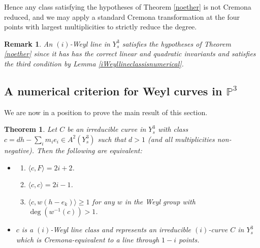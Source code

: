 \documentclass[12pt]{article}
\numberwithin{equation}{section}
\newtheorem{theorem}[equation]{Theorem}
\newtheorem{remark}[equation]{Remark}
\numberwithin{equation}{section}
\numberwithin{subeq}{equation}
\begin{document}
Hence any class satisfying the hypotheses of Theorem \ref{noether}
is not Cremona reduced, and we may apply a standard Cremona transformation
at the four points with largest multiplicities to strictly reduce the degree.

\begin{remark}
An $(i)$-Weyl line in $Y^3_s$ satisfies the hypotheses of Theorem \ref{noether}
since it has has the correct linear and quadratic invariants
and satisfies the third condition by Lemma \ref{iWeyllineclassisnumerical}.
\end{remark}

\subsection{A numerical criterion for Weyl curves in $\mathbb{P}^3$}
We are now in a position to prove the main result of this section.


\begin{theorem}\label{equivalence2}
Let $C$ be an irreducible curve in $Y^3_s$ with class $c = dh-\sum_i m_i e_i \in A^2(Y^3_s)$ 
such that $d>1$ (and all multiplicities non-negative).
Then the following are equivalent:
\begin{itemize}	
\item[(a)] 
	\begin{enumerate}
		\item 	$\langle c, F \rangle=2i+2$. 
		\item	$\langle c, c \rangle= 2i-1$.
		\item	$\langle c, w(h-e_k)\rangle\geq 1$
			for any $w$ in the Weyl group with $\deg(w^{-1}(c))>1$.
	\end{enumerate}
\item[(b)] $c$ is a $(i)$-Weyl line class 
and represents an irreducible $(i)$-curve $C$ in $Y^3_s$ 
which is Cremona-equivalent to a line through $1-i$ points.
\end{itemize}
\end{theorem}
\end{document}
